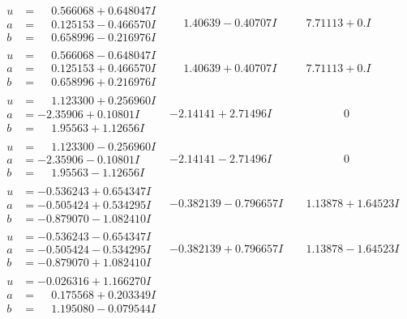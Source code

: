 \documentclass[1p]{elsarticle_modified}
\theoremstyle{definition}
\begin{document}
$$\begin{array}{c|c|c}
\begin{aligned}
u &= \phantom{-}0.566068 + 0.648047 I \\
a &= \phantom{-}0.125153 - 0.466570 I \\
b &= \phantom{-}0.658996 - 0.216976 I\end{aligned}
 & \phantom{-}1.40639 - 0.40707 I & \phantom{-}7.71113 + 0. I\phantom{ +0.000000I} \\ \hline\begin{aligned}
u &= \phantom{-}0.566068 - 0.648047 I \\
a &= \phantom{-}0.125153 + 0.466570 I \\
b &= \phantom{-}0.658996 + 0.216976 I\end{aligned}
 & \phantom{-}1.40639 + 0.40707 I & \phantom{-}7.71113 + 0. I\phantom{ +0.000000I} \\ \hline\begin{aligned}
u &= \phantom{-}1.123300 + 0.256960 I \\
a &= -2.35906 + 0.10801 I \\
b &= \phantom{-}1.95563 + 1.12656 I\end{aligned}
 & -2.14141 + 2.71496 I & \phantom{-0.000000 } 0 \\ \hline\begin{aligned}
u &= \phantom{-}1.123300 - 0.256960 I \\
a &= -2.35906 - 0.10801 I \\
b &= \phantom{-}1.95563 - 1.12656 I\end{aligned}
 & -2.14141 - 2.71496 I & \phantom{-0.000000 } 0 \\ \hline\begin{aligned}
u &= -0.536243 + 0.654347 I \\
a &= -0.505424 + 0.534295 I \\
b &= -0.879070 - 1.082410 I\end{aligned}
 & -0.382139 - 0.796657 I & \phantom{-}1.13878 + 1.64523 I \\ \hline\begin{aligned}
u &= -0.536243 - 0.654347 I \\
a &= -0.505424 - 0.534295 I \\
b &= -0.879070 + 1.082410 I\end{aligned}
 & -0.382139 + 0.796657 I & \phantom{-}1.13878 - 1.64523 I \\ \hline\begin{aligned}
u &= -0.026316 + 1.166270 I \\
a &= \phantom{-}0.175568 + 0.203349 I \\
b &= \phantom{-}1.195080 - 0.079544 I\end{aligned}

\end{array}$$
\end{document}
